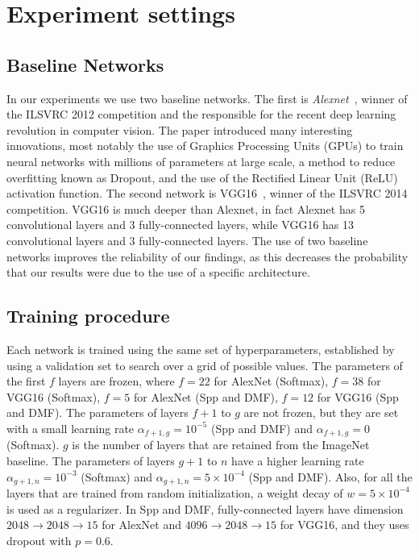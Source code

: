 \documentclass[../main.tex]{subfiles}
\begin{document}
    \section{Experiment settings}

    \subsection{Baseline Networks}\label{subsec:networks}
    In our experiments we use two baseline networks. The first is \textit{Alexnet}~\cite{alexnet}, winner of the ILSVRC 2012 competition
    and the responsible for the recent deep learning revolution in computer vision. The paper introduced many interesting innovations, most
    notably the use of Graphics Processing Units (GPUs) to train neural networks with millions of parameters at large scale, a method
    to reduce overfitting known as Dropout, and the use of the Rectified Linear Unit (ReLU) activation function.
    The second network is VGG16~\cite{vgg16}, winner of the ILSVRC 2014 competition.
    VGG16 is much deeper than Alexnet, in fact Alexnet has 5 convolutional layers and 3 fully-connected layers, while VGG16 has 13
    convolutional layers and 3 fully-connected layers. The use of two baseline networks improves the reliability of our findings,
    as this decreases the probability that our results were due to the use of a specific architecture.

    \subsection{Training procedure}
    Each network is trained using the same set of hyperparameters, established by using a validation set to search over a grid of
    possible values.
    The parameters of the first $f$ layers are frozen, where $f = 22$ for AlexNet (Softmax), $f = 38$ for VGG16 (Softmax),
    $f = 5$ for AlexNet (Spp and DMF), $f = 12$ for VGG16 (Spp and DMF).
    The parameters of layers $f + 1$ to $g$ are not frozen, but they are set with a small learning rate $\alpha_{f+1,g} = 10^{-5}$ (Spp and DMF)
    and $\alpha_{f+1,g} = 0$ (Softmax). $g$ is the number of layers that are retained from the ImageNet baseline.
    The parameters of layers $g + 1$ to $n$ have a higher learning rate $\alpha_{g+1,n} = 10^{-3}$ (Softmax) and $\alpha_{g+1,n} = 5 \times 10^{-4}$
    (Spp and DMF). Also, for all the layers that are trained from random initialization, a weight decay of $w = 5 \times 10^{-4}$ is used as a regularizer.
    In Spp and DMF, fully-connected layers have dimension $2048 \rightarrow 2048 \rightarrow 15 $ for AlexNet and $4096 \rightarrow 2048
    \rightarrow 15 $ for VGG16, and they uses dropout with $p = 0.6$.
\end{document}
